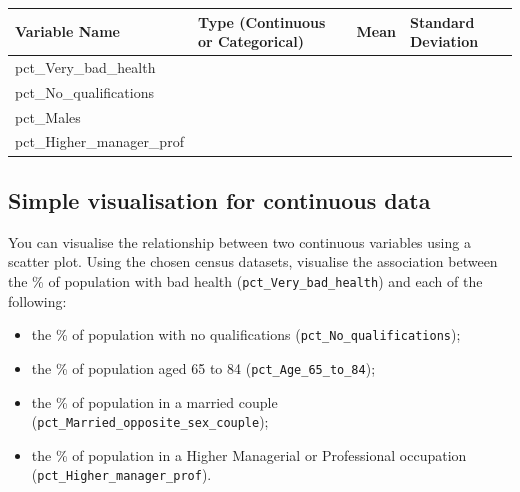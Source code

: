 \documentclass[
  letterpaper,
  DIV=11,
  numbers=noendperiod]{scrreprt}
\providecommand{\tightlist}{%
  \setlength{\itemsep}{0pt}\setlength{\parskip}{0pt}}\usepackage{longtable,booktabs,array}
\begin{document}
\begin{longtable}[]{@{}
  >{\raggedright\arraybackslash}p{}
  >{\raggedright\arraybackslash}p{}
  >{\raggedright\arraybackslash}p{}
  >{\raggedright\arraybackslash}p{}@{}}
\toprule\noalign{}
\begin{minipage}[b]{\linewidth}\raggedright
Variable Name
\end{minipage} & \begin{minipage}[b]{\linewidth}\raggedright
Type (Continuous or Categorical)
\end{minipage} & \begin{minipage}[b]{\linewidth}\raggedright
Mean
\end{minipage} & \begin{minipage}[b]{\linewidth}\raggedright
Standard Deviation
\end{minipage} \\
\midrule\noalign{}
\endhead
\bottomrule\noalign{}
\endlastfoot
pct\_Very\_bad\_health & & & \\
pct\_No\_qualifications & & & \\
pct\_Males & & & \\
pct\_Higher\_manager\_prof & & & \\
\end{longtable}

\subsection{Simple visualisation for continuous
data}\label{simple-visualisation-for-continuous-data}

You can visualise the relationship between two continuous variables
using a scatter plot. Using the chosen census datasets, visualise the
association between the \% of population with bad health
(\texttt{pct\_Very\_bad\_health}) and each of the following:

\begin{itemize}
\tightlist
\item
  the \% of population with no qualifications
  (\texttt{pct\_No\_qualifications});
\item
  the \% of population aged 65 to 84 (\texttt{pct\_Age\_65\_to\_84});
\item
  the \% of population in a married couple
  (\texttt{pct\_Married\_opposite\_sex\_couple});
\item
  the \% of population in a Higher Managerial or Professional occupation
  (\texttt{pct\_Higher\_manager\_prof}).
\end{itemize}
\end{document}
